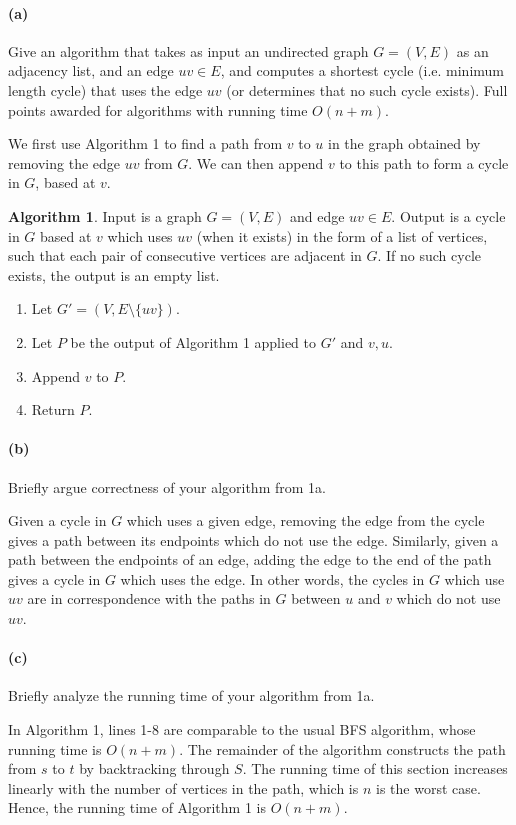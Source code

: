 \documentclass[12pt]{article}
\newlength{\myparskip}
\newenvironment{fullbox}{\begin{lrbox}{\savefullbox}\begin{minipage}{\dimexpr\textwidth-2\fboxsep\relax}\setlength{\parskip}{\myparskip}}{\end{minipage}\end{lrbox}\framebox[\textwidth]{\usebox{\savefullbox}}}
\newenvironment{pbox}[1][]{\begin{fullbox}\def\temp{#1}\ifx\temp\empty\else\paragraph{#1}\phantom{}\fi}{\end{fullbox}}
\theoremstyle{definition}
\newtheorem{algorithm}{Algorithm}
\newcommand{\<}{\langle}
\renewcommand{\>}{\rangle}
\begin{document}
\begin{pbox}[(a)]
    Give an algorithm that takes as input an undirected graph $G = (V, E)$ as an adjacency list, and an edge $uv \in E$, and computes a shortest cycle (i.e. minimum length cycle) that uses the edge $uv$ (or determines that no such cycle exists). Full points awarded for algorithms with running time $O(n + m)$.
\end{pbox}

We first use Algorithm 1 to find a path from $v$ to $u$ in the graph obtained by removing the edge $uv$ from $G$.
We can then append $v$ to this path to form a cycle in $G$, based at $v$.


\begin{algorithm}
    Input is a graph $G = (V, E)$ and edge $uv \in E$.
    Output is a cycle in $G$ based at $v$ which uses $uv$ (when it exists) in the form of a list of vertices, such that each pair of consecutive vertices are adjacent in $G$.
    If no such cycle exists, the output is an empty list.
\end{algorithm}

\begin{enumerate}
    \item Let $G' = (V, E \setminus \{uv\})$.
    \item Let $P$ be the output of Algorithm 1 applied to $G'$ and $v, u$.
    \item Append $v$ to $P$.
    \item Return $P$.
\end{enumerate}





\begin{pbox}[(b)]
    Briefly argue correctness of your algorithm from 1a.
\end{pbox}

Given a cycle in $G$ which uses a given edge, removing the edge from the cycle gives a path between its endpoints which do not use the edge.
Similarly, given a path between the endpoints of an edge, adding the edge to the end of the path gives a cycle in $G$ which uses the edge.
In other words, the cycles in $G$ which use $uv$ are in correspondence with the paths in $G$ between $u$ and $v$ which do not use $uv$.


\begin{pbox}[(c)]
    Briefly analyze the running time of your algorithm from 1a.
\end{pbox}

In Algorithm 1, lines 1-8 are comparable to the usual BFS algorithm, whose running time is $O(n + m)$.
The remainder of the algorithm constructs the path from $s$ to $t$ by backtracking through $S$.
The running time of this section increases linearly with the number of vertices in the path, which is $n$ is the worst case.
Hence, the running time of Algorithm 1 is $O(n + m)$.
\end{document}
